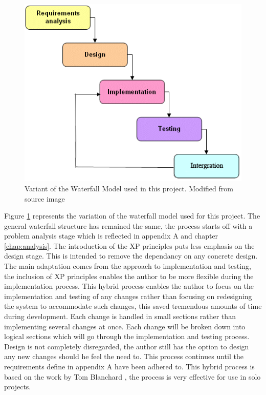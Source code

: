 \begin{figure}[H]
\centering
\includegraphics[scale=0.7]{Images/chapter3/waterfallmodel}
\caption[Waterfall Model Variant]{Variant of the Waterfall Model used in this project. Modified from source image \cite{waterfall:image}}
\label{fig:waterfall}
\end{figure}

Figure \ref{fig:waterfall} represents the variation of the waterfall model used for this project. The general waterfall structure has remained the same, the process starts off with a problem analysis stage which is reflected in appendix A and chapter \ref{chap:analysis}. The introduction of the XP principles puts less emphasis on the design stage. This is intended to remove the dependancy on any concrete design. The main adaptation comes from the approach to implementation and testing, the inclusion of XP principles enables the author to be more flexible during the implementation process. This hybrid process enables the author to focus on the implementation and testing of any changes rather than focusing on redesigning the system to accommodate such changes, this saved tremendous amounts of time during development. Each change is handled in small sections rather than implementing several changes at once. Each change will be broken down into logical sections which will go through the implementation and testing process. Design is not completely disregarded, the author still has the option to design any new changes should he feel the need to. This process continues until the requirements define in appendix A have been adhered to. This hybrid process is based on the work by Tom Blanchard \cite{tblanch:diss}, the process is very effective for use in solo projects.
